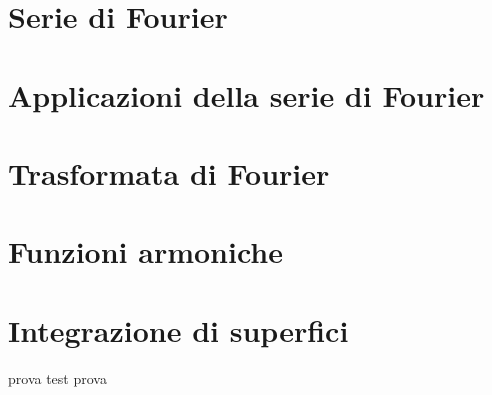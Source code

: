 \documentclass[a4paper, 11pt]{report}
\begin{document}

\chapter{Serie di Fourier}


\chapter{Applicazioni della serie di Fourier}


\chapter{Trasformata di Fourier}


\chapter{Funzioni armoniche}


\chapter{Integrazione di superfici}


\newpage

prova test prova 
\end{document}

